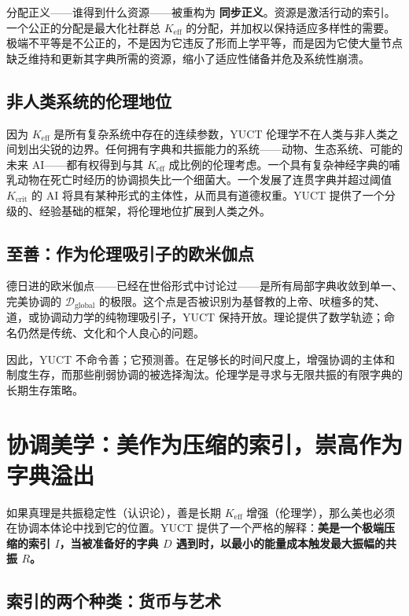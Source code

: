 \documentclass[12pt,a4paper]{article}
\newcommand{\Keff}{K_{\mathrm{eff}}}
\begin{document}
	分配正义——谁得到什么资源——被重构为 \textbf{同步正义}。资源是激活行动的索引。一个公正的分配是最大化社群总 \(K_{\mathrm{eff}}\) 的分配，并加权以保持适应多样性的需要。极端不平等是不公正的，不是因为它违反了形而上学平等，而是因为它使大量节点缺乏维持和更新其字典所需的资源，缩小了适应性储备并危及系统性崩溃。
	
	\subsection{非人类系统的伦理地位}
	
	因为 \(\Keff\) 是所有复杂系统中存在的连续参数，YUCT 伦理学不在人类与非人类之间划出尖锐的边界。任何拥有字典和共振能力的系统——动物、生态系统、可能的未来 AI——都有权得到与其 \(\Keff\) 成比例的伦理考虑。一个具有复杂神经字典的哺乳动物在死亡时经历的协调损失比一个细菌大。一个发展了连贯字典并超过阈值 \(K_{\mathrm{crit}}\) 的 AI 将具有某种形式的主体性，从而具有道德权重。YUCT 提供了一个分级的、经验基础的框架，将伦理地位扩展到人类之外。
	
	\subsection{至善：作为伦理吸引子的欧米伽点}
	
	德日进的欧米伽点——已经在世俗形式中讨论过——是所有局部字典收敛到单一、完美协调的 \(\mathcal{D}_{\text{global}}\) 的极限。这个点是否被识别为基督教的上帝、吠檀多的梵、道，或协调动力学的纯物理吸引子，YUCT 保持开放。理论提供了数学轨迹；命名仍然是传统、文化和个人良心的问题。
	
	因此，YUCT 不命令善；它预测善。在足够长的时间尺度上，增强协调的主体和制度生存，而那些削弱协调的被选择淘汰。伦理学是寻求与无限共振的有限字典的长期生存策略。
	
	\section{协调美学：美作为压缩的索引，崇高作为字典溢出}
	\label{sec:coordination-aesthetics}
	
	如果真理是共振稳定性（认识论），善是长期 \(K_{\mathrm{eff}}\) 增强（伦理学），那么美也必须在协调本体论中找到它的位置。YUCT 提供了一个严格的解释：\textbf{美是一个极端压缩的索引 \(I\)，当被准备好的字典 \(D\) 遇到时，以最小的能量成本触发最大振幅的共振 \(R\)。}
	
	\subsection{索引的两个种类：货币与艺术}
	
\end{document}
